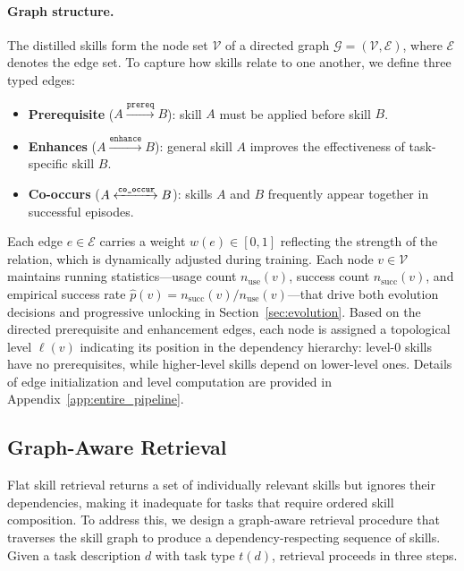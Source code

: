 \paragraph{Graph structure.}
The distilled skills form the node set $\mathcal{V}$ of a directed graph $\mathcal{G} = (\mathcal{V}, \mathcal{E})$, where $\mathcal{E}$ denotes the edge set. To capture how skills relate to one another, we define three typed edges:
\begin{itemize}[leftmargin=*, nosep]
    \item \textbf{Prerequisite} ($A \xrightarrow{\texttt{prereq}} B$): skill $A$ must be applied before skill $B$.
    \item \textbf{Enhances} ($A \xrightarrow{\texttt{enhance}} B$): general skill $A$ improves the effectiveness of task-specific skill $B$.
    \item \textbf{Co-occurs} ($A \xleftrightarrow{\texttt{co\_occur}} B$): skills $A$ and $B$ frequently appear together in successful episodes.
\end{itemize}
Each edge $e \in \mathcal{E}$ carries a weight $w(e) \in [0, 1]$ reflecting the strength of the relation, which is dynamically adjusted during training. Each node $v \in \mathcal{V}$ maintains running statistics---usage count $n_\text{use}(v)$, success count $n_\text{succ}(v)$, and empirical success rate $\hat{p}(v) = n_\text{succ}(v) / n_\text{use}(v)$---that drive both evolution decisions and progressive unlocking in Section~\ref{sec:evolution}. Based on the directed prerequisite and enhancement edges, each node is assigned a topological level $\ell(v)$ indicating its position in the dependency hierarchy: level-0 skills have no prerequisites, while higher-level skills depend on lower-level ones. Details of edge initialization and level computation are provided in Appendix~\ref{app:entire_pipeline}.

\subsection{Graph-Aware Retrieval}
\label{sec:retrieval}

Flat skill retrieval returns a set of individually relevant skills but ignores their dependencies, making it inadequate for tasks that require ordered skill composition. To address this, we design a graph-aware retrieval procedure that traverses the skill graph to produce a dependency-respecting sequence of skills. Given a task description $d$ with task type $t(d)$, retrieval proceeds in three steps.

